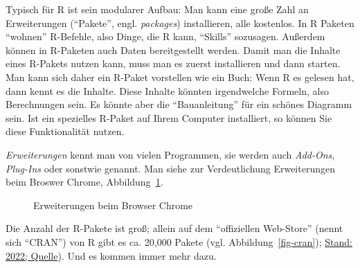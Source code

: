 \documentclass[
  a4paper,
]{scrbook}
\theoremstyle{definition}
\theoremstyle{definition}
\theoremstyle{definition}
\theoremstyle{remark}
\begin{document}
Typisch für R ist sein modularer Aufbau: Man kann eine große Zahl an
Erweiterungen (``Pakete'', engl. \emph{packages}) installieren, alle
kostenlos. In R Paketen ``wohnen'' R-Befehle, also Dinge, die R kann,
``Skills'' sozusagen. Außerdem können in R-Paketen auch Daten
bereitgestellt werden. Damit man die Inhalte eines R-Pakets nutzen kann,
muss man es zuerst installieren und dann starten. Man kann sich daher
ein R-Paket vorstellen wie ein Buch: Wenn R es gelesen hat, dann kennt
es die Inhalte. Diese Inhalte könnten irgendwelche Formeln, also
Berechnungen sein. Es könnte aber die ``Bauanleitung'' für ein schönes
Diagramm sein. Ist ein spezielles R-Paket auf Ihrem Computer
installiert, so können Sie diese Funktionalität nutzen.

\emph{Erweiterungen} kennt man von vielen Programmen, sie werden auch
\emph{Add-Ons}, \emph{Plug-Ins} oder sonstwie genannt. Man siehe zur
Verdeutlichung Erweiterungen beim Broswer Chrome,
Abbildung~\ref{fig-chrome}.

\begin{figure}


\caption{\label{fig-chrome}Erweiterungen beim Browser Chrome}

\end{figure}%

Die Anzahl der R-Pakete ist groß; allein auf dem ``offiziellen
Web-Store'' (nennt sich ``CRAN'') von R gibt es ca. 20,000 Pakete (vgl.
Abbildung~\ref{fig-cran});
\href{https://gist.github.com/daroczig/3cf06d6db4be2bbe3368}{Stand:
2022; Quelle}). Und es kommen immer mehr dazu.
\end{document}

